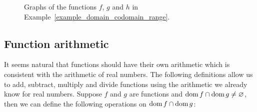 \begin{example}
\begin{figure}[H]
\centering
\centerline{
\hspace{1cm}
}
\caption{Graphs of the functions $f$, $g$ and $h$ in Example~\ref{example_domain_codomain_range}. }
\label{fig_functions_12}
\end{figure}



\end{example}



\subsection{Function arithmetic}\label{rekenen_functies}
It seems natural that functions should have their own arithmetic which is consistent with the arithmetic of real numbers.  The following definitions allow us to add, subtract, multiply and divide functions using the arithmetic we already know for real numbers.
Suppose $f$ and $g$ are functions and $\text{dom}{\,}f\cap\text{dom}{\,}g\neq\varnothing$, then we can define the following operations on $\text{dom}{\,}f\cap\text{dom}{\,}g$:

